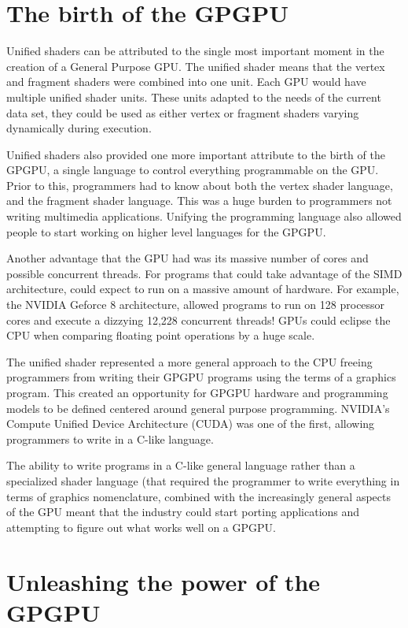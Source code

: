 \section*{The birth of the GPGPU}

Unified shaders can be attributed to the single most important moment in the creation of a General Purpose GPU. The unified shader means that the vertex and fragment shaders were combined into one unit. Each GPU would have multiple unified shader units. These units adapted to the needs of the current data set, they could be used as either vertex or fragment shaders varying dynamically during execution. 

Unified shaders also provided one more important attribute to the birth of the GPGPU, a single language to control everything programmable on the GPU. Prior to this, programmers had to know about both the vertex shader language, and the fragment shader language. This was a huge burden to programmers not writing multimedia applications. Unifying the programming language also allowed people to start working on higher level languages for the GPGPU. 

Another advantage that the GPU had was its massive number of cores and possible concurrent threads. For programs that could take advantage of the SIMD architecture, could expect to run on a massive amount of hardware. For example, the NVIDIA Geforce 8 architecture, allowed programs to run on 128 processor cores and execute a dizzying 12,228 concurrent threads! GPUs could eclipse the CPU when comparing floating point operations by a huge scale. \cite{emergingtech}

The unified shader represented a more general approach to the CPU freeing programmers from writing their GPGPU programs using the terms of a graphics program. This created an opportunity for GPGPU hardware and programming models to be defined centered around general purpose programming. NVIDIA's Compute Unified Device Architecture (CUDA) was one of the first, allowing programmers to write in a C-like language. 

The ability to write programs in a C-like general language rather than a specialized shader language (that required the programmer to write everything in terms of graphics nomenclature, combined with the increasingly general aspects of the GPU meant that the industry could start porting applications and attempting to figure out what works well on a GPGPU. 

\section*{Unleashing the power of the GPGPU}



